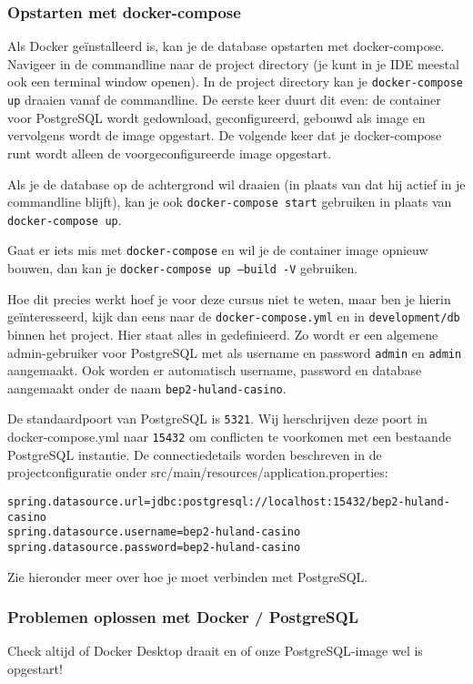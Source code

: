 \subsubsection{Opstarten met docker-compose}
Als Docker geïnstalleerd is, kan je de database opstarten met docker-compose.
Navigeer in de commandline naar de project directory (je kunt in je IDE meestal ook een terminal window openen).
In de project directory kan je \texttt{docker-compose up} draaien vanaf de commandline. 
De eerste keer duurt dit even: de container voor PostgreSQL wordt gedownload, geconfigureerd,
gebouwd als image en vervolgens wordt de image opgestart.
De volgende keer dat je docker-compose runt wordt alleen de voorgeconfigureerde image opgestart.

Als je de database op de achtergrond wil draaien (in plaats van dat hij actief in je commandline blijft),
kan je ook \texttt{docker-compose start} gebruiken in plaats van \texttt{docker-compose up}.

Gaat er iets mis met \texttt{docker-compose} en wil je de container image opnieuw bouwen,
dan kan je \texttt{docker-compose up --build -V} gebruiken.

Hoe dit precies werkt hoef je voor deze cursus niet te weten,
maar ben je hierin geïnteresseerd, kijk dan eens naar de \texttt{docker-compose.yml}
en in \texttt{development/db} binnen het project. Hier staat alles in gedefinieerd.
Zo wordt er een algemene admin-gebruiker voor PostgreSQL met als username en password 
\texttt{admin} en \texttt{admin} aangemaakt. Ook worden er automatisch username, password en database 
aangemaakt onder de naam \texttt{bep2-huland-casino}.

De standaardpoort van PostgreSQL is \texttt{5321}. Wij herschrijven deze poort in docker-compose.yml
naar \texttt{15432} om conflicten te voorkomen met een bestaande PostgreSQL instantie. 
De connectiedetails worden beschreven in de projectconfiguratie onder src/main/resources/application.properties:

\begin{verbatim}
spring.datasource.url=jdbc:postgresql://localhost:15432/bep2-huland-casino
spring.datasource.username=bep2-huland-casino
spring.datasource.password=bep2-huland-casino
\end{verbatim}

Zie hieronder meer over hoe je moet verbinden met PostgreSQL.

\subsubsection{Problemen oplossen met Docker / PostgreSQL}
Check altijd of Docker Desktop draait en of onze PostgreSQL-image wel is opgestart!

